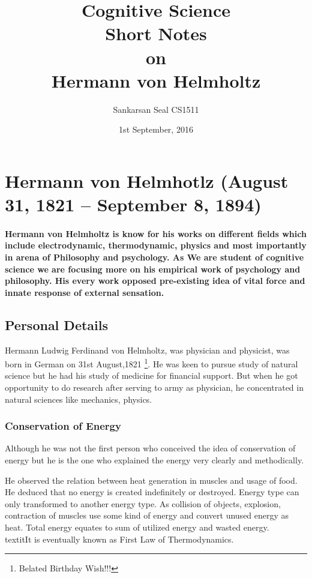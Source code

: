 \documentclass[11pt]{article}
\begin{document}
\title{Cognitive Science\\ Short Notes\\ on\\ Hermann von Helmholtz}
\author{Sankarsan Seal CS1511}
\date{1st September, 2016}
\maketitle

\section{Hermann von Helmhotlz (August 31, 1821  – September 8, 1894)}
\paragraph{Hermann von Helmholtz is know for his works on different fields which include electrodynamic, thermodynamic, physics and most importantly in arena of Philosophy and psychology. As We are student of cognitive science we are focusing more on his empirical work of psychology and philosophy. His every work opposed pre-existing idea of vital force and innate response of external sensation.}

\subsection{Personal Details}
Hermann Ludwig Ferdinand von Helmholtz, was physician and physicist, was born in German on 31st August,1821 \footnote{Belated Birthday Wish!!!}. He was keen to pursue study of natural science but he had his study of medicine for financial support. But when he got opportunity to do research after serving to army as physician, he concentrated in natural sciences like mechanics, physics.

\subsubsection{Conservation of Energy}
Although he was not the first person who conceived the idea of conservation of energy but he is the one who explained the energy very clearly and methodically.

He observed the relation between heat generation in muscles and  usage of food. He deduced that no energy is created indefinitely or destroyed. Energy type can only transformed to another energy type. As collision of objects, explosion, contraction of muscles use some kind of energy and convert unused energy as heat. Total energy equates to  sum of utilized energy and wasted energy. \\textit{It is eventually known as First Law of Thermodynamics.}
\end{document}
